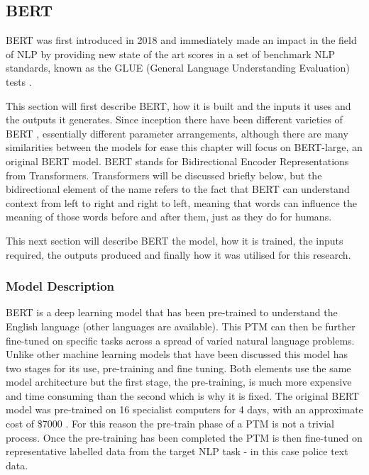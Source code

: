 \subsection{BERT} BERT was first introduced in 2018 \parencite{devlin2018bert} and immediately made an impact in the field of NLP by providing new state of the art scores in a set of benchmark NLP standards, known as the GLUE (General Language Understanding Evaluation) tests \parencite{wang2018glue}. 

This section will first describe BERT, how it is built and the inputs it uses and the outputs it generates. Since inception there have been different varieties of BERT \parencite{rogers2020primer}, essentially different parameter arrangements, although there are many similarities between the models for ease this chapter will focus on BERT-large, an original BERT model. BERT stands for Bidirectional Encoder Representations from Transformers. Transformers will be discussed briefly below, but the bidirectional element of the name refers to the fact that BERT can understand context from left to right and right to left, meaning that words can influence the meaning of those words before and after them, just as they do for humans.

This next section will describe BERT the model, how it is trained, the inputs required, the outputs produced and finally how it was utilised for this research.

\subsubsection{Model Description} BERT is a deep learning model that has been pre-trained to understand the English language (other languages are available). This PTM can then be further fine-tuned on specific tasks across a spread of varied natural language problems. Unlike other machine learning models that have been discussed this model has two stages for its use, pre-training and fine tuning. Both elements use the same model architecture but the first stage, the pre-training, is much more expensive and time consuming than the second which is why it is fixed. The original BERT model was pre-trained on 16 specialist computers for 4 days, with an approximate cost of \$7000 \parencite{devlin2018bert}. For this reason the pre-train phase of a PTM is not a trivial process. Once the pre-training has been completed the PTM is then fine-tuned on representative labelled data from the target NLP task - in this case police text data.

